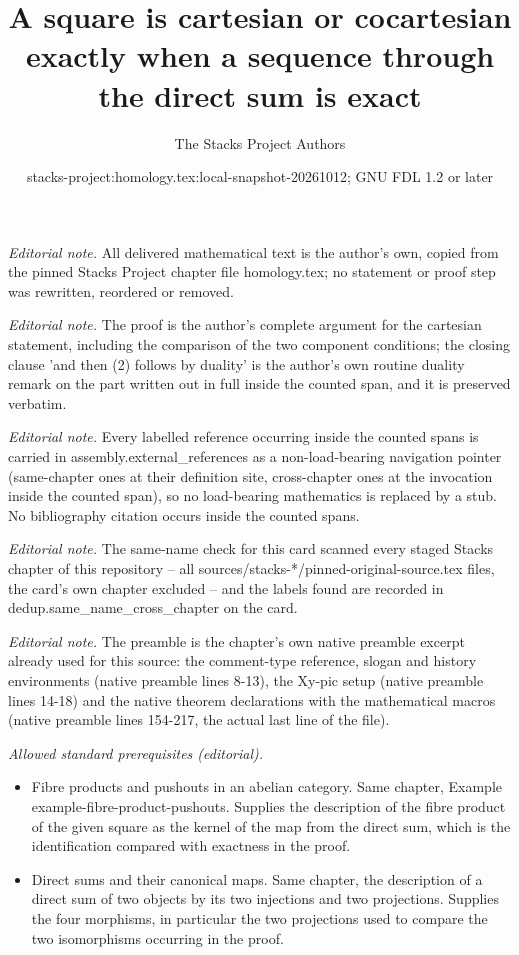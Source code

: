 \documentclass[10pt,a4paper]{amsart}
\title{A square is cartesian or cocartesian exactly when a sequence through the direct sum is exact}
\author{The Stacks Project Authors}
\date{stacks-project:homology.tex:local-snapshot-20261012; GNU FDL 1.2 or later}
\theoremstyle{plain}
\theoremstyle{definition}
\theoremstyle{remark}
\numberwithin{equation}{subsection}
\begin{document}
\maketitle
\noindent\textit{Editorial note.} All delivered mathematical text is the author's own, copied from the pinned Stacks Project chapter file homology.tex; no statement or proof step was rewritten, reordered or removed.\par\medskip
\noindent\textit{Editorial note.} The proof is the author's complete argument for the cartesian statement, including the comparison of the two component conditions; the closing clause 'and then (2) follows by duality' is the author's own routine duality remark on the part written out in full inside the counted span, and it is preserved verbatim.\par\medskip
\noindent\textit{Editorial note.} Every labelled reference occurring inside the counted spans is carried in assembly.external\_references as a non-load-bearing navigation pointer (same-chapter ones at their definition site, cross-chapter ones at the invocation inside the counted span), so no load-bearing mathematics is replaced by a stub. No bibliography citation occurs inside the counted spans.\par\medskip
\noindent\textit{Editorial note.} The same-name check for this card scanned every staged Stacks chapter of this repository -- all sources/stacks-*/pinned-original-source.tex files, the card's own chapter excluded -- and the labels found are recorded in dedup.same\_name\_cross\_chapter on the card.\par\medskip
\noindent\textit{Editorial note.} The preamble is the chapter's own native preamble excerpt already used for this source: the comment-type reference, slogan and history environments (native preamble lines 8-13), the Xy-pic setup (native preamble lines 14-18) and the native theorem declarations with the mathematical macros (native preamble lines 154-217, the actual last line of the file).\par\medskip
\noindent\textit{Allowed standard prerequisites (editorial).}\begin{itemize}
\item Fibre products and pushouts in an abelian category. Same chapter, Example example-fibre-product-pushouts. Supplies the description of the fibre product of the given square as the kernel of the map from the direct sum, which is the identification compared with exactness in the proof.
\item Direct sums and their canonical maps. Same chapter, the description of a direct sum of two objects by its two injections and two projections. Supplies the four morphisms, in particular the two projections used to compare the two isomorphisms occurring in the proof.
\end{itemize}\medskip
\end{document}

